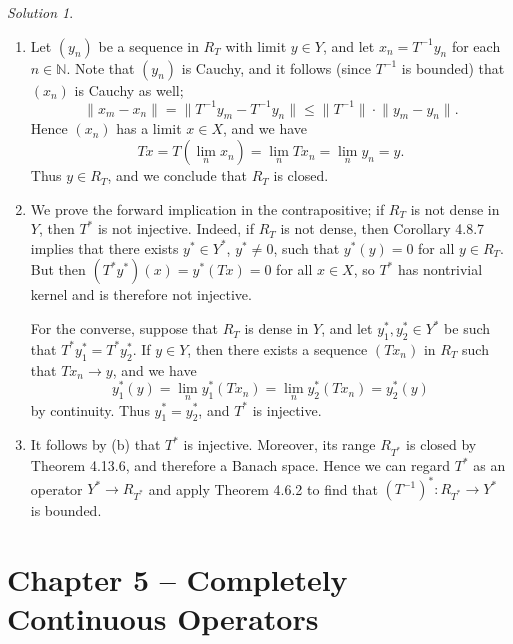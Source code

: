 \documentclass{report}
\newcommand{\bb}[1]{\mathbb{#1}}
\newcommand{\norm}[1]{{\lVert #1 \rVert}}
\theoremstyle{remark}
\newtheorem*{solution}{Solution}
\begin{document}
\begin{solution}
  \leavevmode
  \begin{enumerate}[label=(\alph*)]
    \item Let $(y_n)$ be a sequence in $R_T$ with limit $y \in Y$, and let $x_n = T^{-1} y_n$ for each $n \in \bb N$. Note that $(y_n)$ is Cauchy, and it follows (since $T^{-1}$ is bounded) that $(x_n)$ is Cauchy as well;
      \begin{equation*}
        \norm{x_m - x_n} = \norm{T^{-1} y_m - T^{-1} y_n} \le \norm{T^{-1}} \cdot \norm{y_m - y_n}.
      \end{equation*}
      Hence $(x_n)$ has a limit $x \in X$, and we have
      \begin{equation*}
        Tx = T(\lim_n x_n) = \lim_n Tx_n = \lim_n y_n = y.
      \end{equation*}
      Thus $y \in R_T$, and we conclude that $R_T$ is closed.

    \item We prove the forward implication in the contrapositive; if $R_T$ is not dense in $Y$, then $T^*$ is not injective. Indeed, if $R_T$ is not dense, then Corollary 4.8.7 implies that there exists $y^* \in Y^*$, $y^* \ne 0$, such that $y^*(y) = 0$ for all $y \in R_T$. But then $(T^*y^*)(x) = y^*(Tx) = 0$ for all $x \in X$, so $T^*$ has nontrivial kernel and is therefore not injective.

      For the converse, suppose that $R_T$ is dense in $Y$, and let $y_1^*, y_2^* \in Y^*$ be such that $T^* y_1^* = T^* y_2^*$. If $y \in Y$, then there exists a sequence $(Tx_n)$ in $R_T$ such that $Tx_n \to y$, and we have
      \begin{equation*}
        y_1^*(y)  = \lim_n y_1^*(T x_n) = \lim_n y_2^*(T x_n) = y_2^*(y)
      \end{equation*}
      by continuity. Thus $y_1^* = y_2^*$, and $T^*$ is injective.

    \item It follows by (b) that $T^*$ is injective. Moreover, its range $R_{T^*}$ is closed by Theorem 4.13.6, and therefore a Banach space. Hence we can regard $T^*$ as an operator $Y^* \to R_{T^*}$ and apply Theorem 4.6.2 to find that $(T^{-1})^*: R_{T^*} \to Y^*$ is bounded.
  \end{enumerate}
\end{solution}

\chapter*{Chapter 5 -- Completely Continuous Operators}
\end{document}
